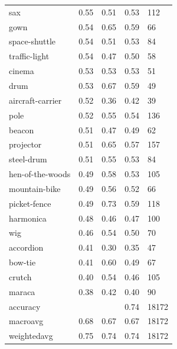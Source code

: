 \begin{center}
\begin{longtable}{lllll}
sax & 0.55 & 0.51 & 0.53 & 112 \\
gown & 0.54 & 0.65 & 0.59 & 66 \\
space-shuttle & 0.54 & 0.51 & 0.53 & 84 \\
traffic-light & 0.54 & 0.47 & 0.50 & 58 \\
cinema & 0.53 & 0.53 & 0.53 & 51 \\
drum & 0.53 & 0.67 & 0.59 & 49 \\
aircraft-carrier & 0.52 & 0.36 & 0.42 & 39 \\
pole & 0.52 & 0.55 & 0.54 & 136 \\
beacon & 0.51 & 0.47 & 0.49 & 62 \\
projector & 0.51 & 0.65 & 0.57 & 157 \\
steel-drum & 0.51 & 0.55 & 0.53 & 84 \\
hen-of-the-woods & 0.49 & 0.58 & 0.53 & 105 \\
mountain-bike & 0.49 & 0.56 & 0.52 & 66 \\
picket-fence & 0.49 & 0.73 & 0.59 & 118 \\
harmonica & 0.48 & 0.46 & 0.47 & 100 \\
wig & 0.46 & 0.54 & 0.50 & 70 \\
accordion & 0.41 & 0.30 & 0.35 & 47 \\
bow-tie & 0.41 & 0.60 & 0.49 & 67 \\
crutch & 0.40 & 0.54 & 0.46 & 105 \\
maraca & 0.38 & 0.42 & 0.40 & 90 \\
\midrule
accuracy &  &  & 0.74 & 18172 \\
macroavg & 0.68 & 0.67 & 0.67 & 18172 \\
weightedavg & 0.75 & 0.74 & 0.74 & 18172 \\
\bottomrule
\end{longtable}
\end{center}
